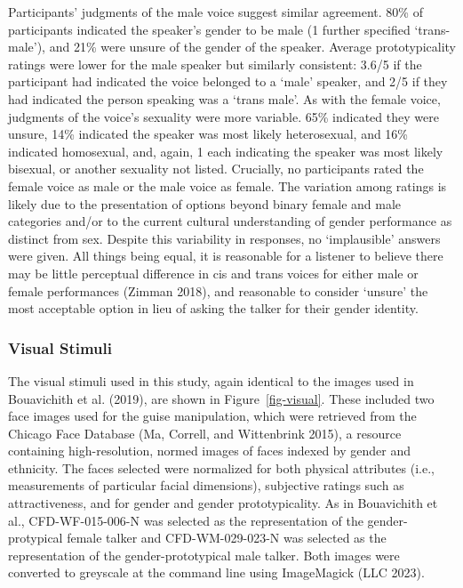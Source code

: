 \documentclass[
  letterpaper,
  DIV=11,
  numbers=noendperiod]{scrartcl}
\begin{document}
Participants' judgments of the male voice suggest similar agreement.
80\% of participants indicated the speaker's gender to be male (1
further specified `trans-male'), and 21\% were unsure of the gender of
the speaker. Average prototypicality ratings were lower for the male
speaker but similarly consistent: 3.6/5 if the participant had indicated
the voice belonged to a `male' speaker, and 2/5 if they had indicated
the person speaking was a `trans male'. As with the female voice,
judgments of the voice's sexuality were more variable. 65\% indicated
they were unsure, 14\% indicated the speaker was most likely
heterosexual, and 16\% indicated homosexual, and, again, 1 each
indicating the speaker was most likely bisexual, or another sexuality
not listed. Crucially, no participants rated the female voice as male or
the male voice as female. The variation among ratings is likely due to
the presentation of options beyond binary female and male categories
and/or to the current cultural understanding of gender performance as
distinct from sex. Despite this variability in responses, no
`implausible' answers were given. All things being equal, it is
reasonable for a listener to believe there may be little perceptual
difference in cis and trans voices for either male or female
performances (Zimman 2018), and reasonable to consider `unsure' the most
acceptable option in lieu of asking the talker for their gender
identity.

\subsubsection{Visual Stimuli}\label{sec-stimuli-visual}

The visual stimuli used in this study, again identical to the images
used in Bouavichith et al. (2019), are shown in Figure~\ref{fig-visual}.
These included two face images used for the guise manipulation, which
were retrieved from the Chicago Face Database (Ma, Correll, and
Wittenbrink 2015), a resource containing high-resolution, normed images
of faces indexed by gender and ethnicity. The faces selected were
normalized for both physical attributes (i.e., measurements of
particular facial dimensions), subjective ratings such as
attractiveness, and for gender and gender prototypicality. As in
Bouavichith et al., CFD-WF-015-006-N was selected as the representation
of the gender-protypical female talker and CFD-WM-029-023-N was selected
as the representation of the gender-prototypical male talker. Both
images were converted to greyscale at the command line using ImageMagick
(LLC 2023).
\end{document}
